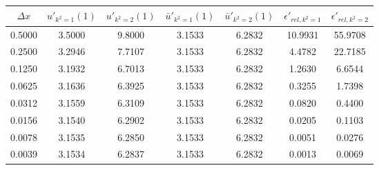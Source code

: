 \begin{tabular}{|c|c|c|c|c|c|c|}
\hline
\textbf{$\Delta x$}&\textbf{$u'_{k^2=1}(1)$}&\textbf{$u'_{k^2=2}(1)$}&\textbf{$\bar{u}'_{k^2=1}(1)$}&\textbf{$\bar{u}'_{k^2=2}(1)$}&\textbf{$\epsilon'_{rel,k^2=1}$}&\textbf{$\epsilon'_{rel,k^2=2}$}\\\hline
0.5000&3.5000&9.8000&3.1533&6.2832&10.9931&55.9708\\\hline
0.2500&3.2946&7.7107&3.1533&6.2832&4.4782&22.7185\\\hline
0.1250&3.1932&6.7013&3.1533&6.2832&1.2630&6.6544\\\hline
0.0625&3.1636&6.3925&3.1533&6.2832&0.3255&1.7398\\\hline
0.0312&3.1559&6.3109&3.1533&6.2832&0.0820&0.4400\\\hline
0.0156&3.1540&6.2902&3.1533&6.2832&0.0205&0.1103\\\hline
0.0078&3.1535&6.2850&3.1533&6.2832&0.0051&0.0276\\\hline
0.0039&3.1534&6.2837&3.1533&6.2832&0.0013&0.0069\\\hline
\end{tabular}
